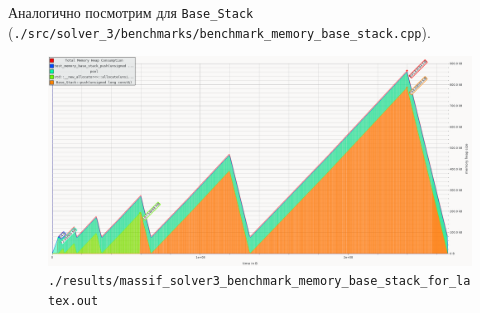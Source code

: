 Аналогично посмотрим для \texttt{Base_Stack} (\texttt{./src/solver_3/benchmarks/\-benchmark\-_memory_\-base_stack.cpp}).
\begin{figure}[H]
  \centering
  \includegraphics[width=1.0\textwidth]{../../resources/memory_consumption_of_solver3_benchmark_memory_base_stack_with_list_1.png}
  \caption{\texttt{./results/massif_solver3_benchmark_memory_base_stack_for_latex.out}}
\end{figure}

